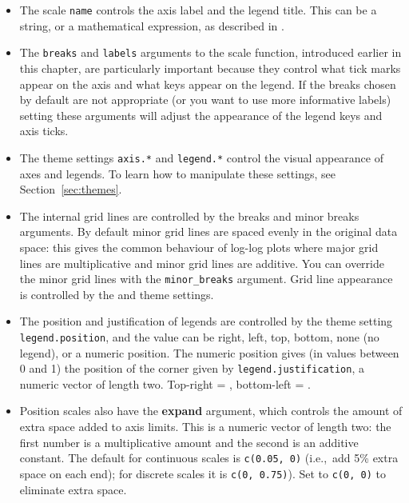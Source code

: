 \begin{itemize}
  \item The scale {\tt name} controls the axis label and the legend title.  This can be a string, or a mathematical expression, as described in .
  
  \item The {\tt breaks} and {\tt labels} arguments to the scale function, introduced earlier in this chapter, are particularly important because they control what tick marks appear on the axis and what keys appear on the legend.  If the breaks chosen by default are not appropriate (or you want to use more informative labels) setting these arguments will adjust the appearance of the legend keys and axis ticks.  
  
  \item The theme settings {\tt axis.*} and {\tt legend.*} control the visual appearance of axes and legends.  To learn how to manipulate these settings, see Section~\ref{sec:themes}.

  \item The internal grid lines are controlled by the breaks and minor breaks arguments.  By default minor grid lines are spaced evenly in the original data space: this gives the common behaviour of log-log plots where major grid lines are multiplicative and minor grid lines are additive.  You can override the minor grid lines with the {\tt minor\_breaks} argument.  Grid line appearance is controlled by the  and  theme settings.

  \item The position and justification of legends are controlled by the theme setting {\tt legend.position}, and the value can be right, left, top, bottom, none (no legend), or a numeric position.  The numeric position gives (in values between 0 and 1) the position of the corner given by {\tt legend.justification}, a numeric vector of length two.  Top-right = , bottom-left = .
  
  \item Position scales also have the {\bf expand} argument, which controls the amount of extra space added to axis limits.  This is a numeric vector of length two: the first number is a multiplicative amount and the second is an additive constant.  The default for continuous scales is {\tt c(0.05, 0)} (i.e.,\ add 5\% extra space on each end); for discrete scales it is {\tt c(0, 0.75)}).  Set to {\tt c(0, 0)} to eliminate extra space.
  
\end{itemize}

